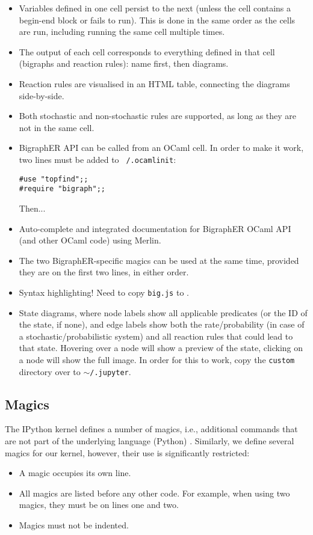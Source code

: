 \documentclass{article}
\begin{document}
\begin{itemize}
\item Variables defined in one cell persist to the next (unless the cell
  contains a begin-end block or fails to run). This is done in the same order as
  the cells are run, including running the same cell multiple times.
\item The output of each cell corresponds to everything defined in that cell
  (bigraphs and reaction rules): name first, then diagrams.
\item Reaction rules are visualised in an HTML table, connecting the diagrams
  side-by-side.
\item Both stochastic and non-stochastic rules are supported, as long as they
  are not in the same cell.
\item BigraphER API can be called from an OCaml cell. In order to make it work,
  two lines must be added to \texttt{~/.ocamlinit}:
  \begin{lstlisting}
#use "topfind";;
#require "bigraph";;
  \end{lstlisting}
  Then... %
\item Auto-complete and integrated documentation for BigraphER OCaml API (and
  other OCaml code) using Merlin.
\item The two BigraphER-specific magics can be used at the same time, provided
  they are on the first two lines, in either order.
\item Syntax highlighting! Need to copy \texttt{big.js} to
  .
  \item State diagrams, where node labels show all applicable predicates (or the
    ID of the state, if none), and edge labels show both the rate/probability
    (in case of a stochastic/probabilistic system) and all reaction rules that
    could lead to that state. Hovering over a node will show a preview of the
    state, clicking on a node will show the full image. In order for this to
    work, copy the \texttt{custom} directory over to
    \texttt{$\sim$/.jupyter}.
\end{itemize}

\subsection{Magics}

The IPython kernel defines a number of magics, i.e., additional commands that
are not part of the underlying language (Python) \cite{website:magic}.
Similarly, we define several magics for our kernel, however, their use is
significantly restricted:
\begin{itemize}
\item A magic occupies its own line.
\item All magics are listed before any other code. For example, when using two
  magics, they must be on lines one and two.
\item Magics must not be indented.
\end{itemize}
\end{document}
